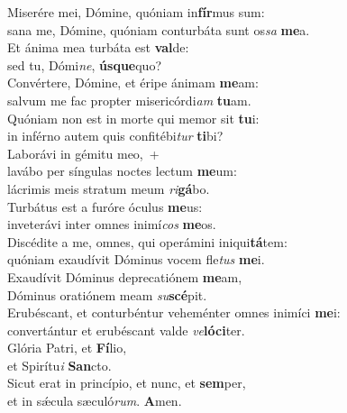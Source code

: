 \evenverse Miserére mei, Dómine, quóniam in\textbf{fír}mus sum:~\*\\
\evenverse sana me, Dómine, quóniam conturbáta sunt os\textit{sa} \textbf{me}a.\\
\oddverse Et ánima mea turbáta est \textbf{val}de:~\*\\
\oddverse sed tu, Dómi\textit{ne}, \textbf{ús}\textbf{que}quo?\\
\evenverse Convértere, Dómine, et éripe ánimam \textbf{me}am:~\*\\
\evenverse salvum me fac propter misericórdi\textit{am} \textbf{tu}am.\\
\oddverse Quóniam non est in morte qui memor sit \textbf{tu}i:~\*\\
\oddverse in inférno autem quis confitébi\textit{tur} \textbf{ti}bi?\\
\evenverse Laborávi in gémitu meo,~+\\
\evenverse  lavábo per síngulas noctes lectum \textbf{me}um:~\*\\
\evenverse lácrimis meis stratum meum \textit{ri}\textbf{gá}bo.\\
\oddverse Turbátus est a furóre óculus \textbf{me}us:~\*\\
\oddverse inveterávi inter omnes inimí\textit{cos} \textbf{me}os.\\
\evenverse Discédite a me, omnes, qui operámini iniqui\textbf{tá}tem:~\*\\
\evenverse quóniam exaudívit Dóminus vocem fle\textit{tus} \textbf{me}i.\\
\oddverse Exaudívit Dóminus deprecatiónem \textbf{me}am,~\*\\
\oddverse Dóminus oratiónem meam \textit{su}\textbf{scé}pit.\\
\evenverse Erubéscant, et conturbéntur veheménter omnes inimíci \textbf{me}i:~\*\\
\evenverse convertántur et erubéscant valde \textit{ve}\textbf{ló}\textbf{ci}ter.\\
\oddverse Glória Patri, et \textbf{Fí}lio,~\*\\
\oddverse et Spirítu\textit{i} \textbf{San}cto.\\
\evenverse Sicut erat in princípio, et nunc, et \textbf{sem}per,~\*\\
\evenverse et in sǽcula sæculó\textit{rum}. \textbf{A}men.\\
